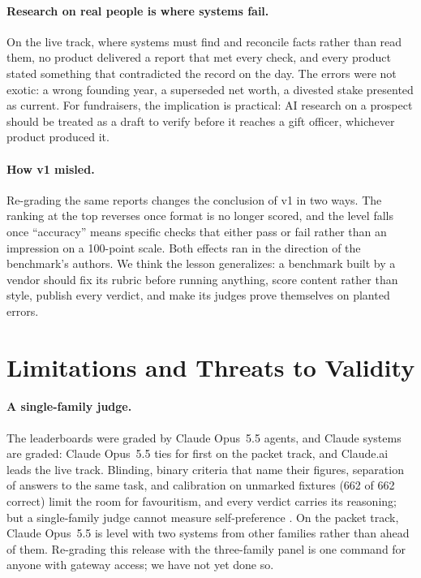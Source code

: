 \documentclass[11pt,a4paper]{article}
\begin{document}
\paragraph{Research on real people is where systems fail.} On the live track, where systems must find and reconcile facts rather than read them, no product delivered a report that met every check, and every product stated something that contradicted the record on the day. The errors were not exotic: a wrong founding year, a superseded net worth, a divested stake presented as current. For fundraisers, the implication is practical: AI research on a prospect should be treated as a draft to verify before it reaches a gift officer, whichever product produced it.

\paragraph{How v1 misled.} Re-grading the same reports changes the conclusion of v1 in two ways. The ranking at the top reverses once format is no longer scored, and the level falls once ``accuracy'' means specific checks that either pass or fail rather than an impression on a 100-point scale. Both effects ran in the direction of the benchmark's authors. We think the lesson generalizes: a benchmark built by a vendor should fix its rubric before running anything, score content rather than style, publish every verdict, and make its judges prove themselves on planted errors.

\section{Limitations and Threats to Validity}
\label{sec:limitations}

\paragraph{A single-family judge.} The leaderboards were graded by Claude Opus~5.5 agents, and Claude systems are graded: Claude Opus~5.5 ties for first on the packet track, and Claude.ai leads the live track. Blinding, binary criteria that name their figures, separation of answers to the same task, and calibration on unmarked fixtures (662 of 662 correct) limit the room for favouritism, and every verdict carries its reasoning; but a single-family judge cannot measure self-preference \citep{panickssery2024llm}. On the packet track, Claude Opus~5.5 is level with two systems from other families rather than ahead of them. Re-grading this release with the three-family panel is one command for anyone with gateway access; we have not yet done so.
\end{document}

